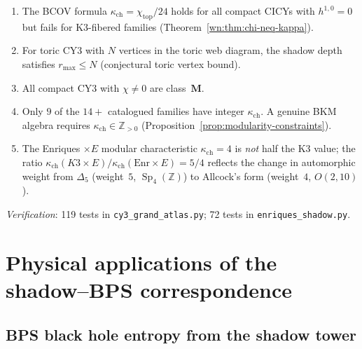 \documentclass[11pt]{article}
\newcommand{\Z}{\mathbb{Z}}
\newcommand{\Sp}{\operatorname{Sp}}
\begin{document}
\begin{observation}
\label{obs:atlas-patterns}
\begin{enumerate}[label=\textup{(\roman*)}]
 \item The BCOV formula $\kappa_{\mathrm{ch}} = \chi_{\mathrm{top}}/24$ holds for all compact CICYs with $h^{1,0} = 0$ but fails for K3-fibered families (Theorem~\ref{wn:thm:chi-neq-kappa}).
 \item For toric CY3 with $N$ vertices in the toric web diagram, the shadow depth satisfies $r_{\max} \leq N$ (conjectural toric vertex bound).
 \item All compact CY3 with $\chi \neq 0$ are class~$\mathbf{M}$.
 \item Only $9$ of the $14+$ catalogued families have integer $\kappa_{\mathrm{ch}}$. A genuine BKM algebra requires $\kappa_{\mathrm{ch}} \in \Z_{>0}$ (Proposition~\ref{prop:modularity-constraints}).
 \item The Enriques $\times E$ modular characteristic $\kappa_{\mathrm{ch}} = 4$ is \emph{not} half the K3 value; the ratio $\kappa_{\mathrm{ch}}(K3 \times E)/\kappa_{\mathrm{ch}}(\text{Enr} \times E) = 5/4$ reflects the change in automorphic weight from $\Delta_5$ (weight~$5$, $\Sp_4(\Z)$) to Allcock's form (weight~$4$, $O(2,10)$).
\end{enumerate}

\noindent\textit{Verification}: 119 tests in \texttt{cy3\_grand\_atlas.py}; 72 tests in \texttt{enriques\_shadow.py}.
\end{observation}


\section{Physical applications of the shadow--BPS correspondence}
\label{sec:physical-applications}

\subsection{BPS black hole entropy from the shadow tower}
\label{subsec:bps-black-hole}
\end{document}
